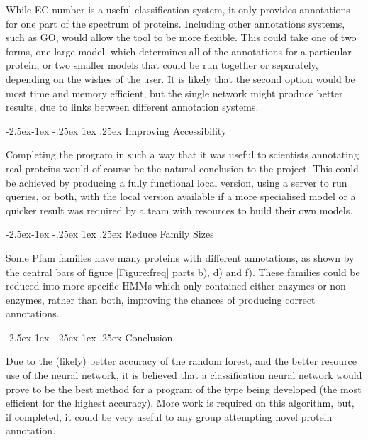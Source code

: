 \documentclass[12pt]{article}
\makeatletter
\renewcommand\subsubsection{\@startsection{subsubsection}{4}{\z@}
            {-2.5ex\@plus -1ex \@minus -.25ex}
            {1ex \@plus .25ex}
            {\normalfont\large\bfseries}}
\renewcommand\section{\@startsection{section}{4}{\z@}
            {-2.5ex\@plus -1ex \@minus -.25ex}
            {1ex \@plus .25ex}
            {\normalfont\LARGE\bfseries}}
\makeatother
\begin{document}
			While EC number is a useful classification system, it only provides annotations for one part of the spectrum of proteins. Including other annotations systems, such as GO, would allow the tool to be more flexible. This could take one of two forms, one large model, which determines all of the annotations for a particular protein, or two smaller models that could be run together or separately, depending on the wishes of the user.  It is likely that the second option would be most time and memory efficient, but the single network might produce better results, due to links between different annotation systems. 

			\subsubsection{Improving Accessibility}
		
			Completing the program in such a way that it was useful to scientists annotating real proteins would of course be the natural conclusion to the project.  This could be achieved by producing a fully functional local version, using a server to run queries, or both, with the local version available if a more specialised model or a quicker result was required by a team with resources to build their own models.
			
			\subsubsection{Reduce Family Sizes}
			
			Some Pfam families have many proteins with different annotations, as shown by the central bars of figure \ref{Figure:freq} parts b), d) and f).  These families could be reduced into more specific HMMs which only contained either enzymes or non enzymes, rather than both, improving the chances of producing correct annotations. 
			
		\section{Conclusion}
		
		Due to the (likely) better accuracy of the random forest, and the better resource use of the neural network, it is believed that a classification neural network would prove to be the best method for a program of the type being developed (the most efficient for the highest accuracy).  More work is required on this algorithm, but, if completed, it could be very useful to any group attempting novel protein annotation.
		
\end{document}
